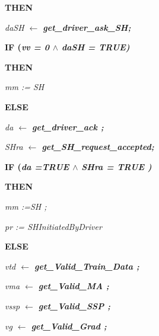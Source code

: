 {\begin{minipage}{14cm}
\hspace*{0.55in}\bf  THEN

\hspace*{0.75in}\it daSH\hspace*{0.10in} $\leftarrow$  \bf get\_driver\_ask\_SH\rm ;

\hspace*{0.75in}\bf IF \rm (\it vv \rm = \rm 0  $\land$  \it daSH \rm = \bf TRUE\rm )

\hspace*{0.75in}\bf THEN

\hspace*{0.95in}\it mm \rm := \it SH

\hspace*{0.75in}\bf ELSE

\hspace*{0.95in}\it da\hspace*{0.10in} $\leftarrow$  \bf get\_driver\_ack \rm ;

\hspace*{0.95in}\it SHra\hspace*{0.10in} $\leftarrow$  \bf get\_SH\_request\_accepted\rm ;

\hspace*{0.95in}\bf IF \rm (\it da \rm =\hspace*{0.10in}\bf TRUE  $\land$  \it SHra \rm = \bf TRUE \rm ) 

\hspace*{0.95in}\bf  THEN

\hspace*{1.15in}\it mm \rm :=\hspace*{0.10in}\it SH \rm ;

\hspace*{1.15in}\it pr \rm := \it SHInitiatedByDriver 

\hspace*{0.95in}\bf ELSE\hspace*{0.15in}

\hspace*{1.20in}\it vtd  $\leftarrow$  \bf get\_Valid\_Train\_Data \rm ;

\hspace*{1.20in}\it vma  $\leftarrow$  \bf get\_Valid\_MA \rm ;

\hspace*{1.20in}\it vssp  $\leftarrow$  \bf get\_Valid\_SSP \rm ;

\hspace*{1.20in}\it vg  $\leftarrow$  \bf get\_Valid\_Grad \rm ;


\end{minipage}}
